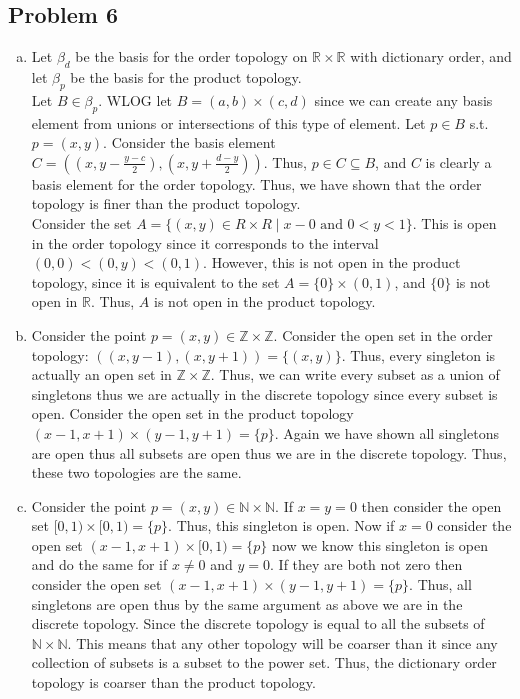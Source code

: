 \documentclass[12pt, letterpaper]{article}
\theoremstyle{definition}
\newcommand{\R}{\mathbb{R}}
\newcommand{\Z}{\mathbb{Z}}
\newcommand{\N}{\mathbb{N}}
\renewcommand{\t}[1]{\text{#1}}
\begin{document}
\newpage
\subsection*{Problem 6}
\begin{enumerate}[(a)]
    \item Let $\beta_d$ be the basis for the order topology on $\R\times \R$ with dictionary order, and let $\beta_p$ be the basis for the product topology.\\
    Let $B \in \beta_p$. WLOG let $B=(a,b)\times(c,d)$ since we can create any basis element from unions or intersections of this type of element. Let $p \in B$ s.t. $p=(x,y)$. Consider the basis element $C=((x,y-\frac{y-c}{2}),(x,y+\frac{d-y}{2}))$. Thus, $p \in C \subseteq B$, and $C$ is clearly a basis element for the order topology. Thus, we have shown that the order topology is finer than the product topology.\\
    Consider the set $A=\{(x,y) \in R\times R \mid x-0 \t{ and } 0 < y < 1\}$. This is open in the order topology since it corresponds to the interval $(0,0)<(0,y)<(0,1)$. However, this is not open in the product topology, since it is equivalent to the set $A=\{0\} \times (0,1)$, and $\{0\}$ is not open in $\R$. Thus, $A$ is not open in the product topology.
    \item Consider the point $p=(x,y) \in \Z \times \Z$. Consider the open set in the order topology: $((x,y-1),(x,y+1))=\{(x,y)\}$. Thus, every singleton is actually an open set in $\Z \times \Z$. Thus, we can write every subset as a union of singletons thus we are actually in the discrete topology since every subset is open. Consider the open set in the product topology $(x-1,x+1) \times (y-1,y+1)=\{p\}$. Again we have shown all singletons are open thus all subsets are open thus we are in the discrete topology. Thus, these two topologies are the same.
    \item Consider the point $p=(x,y) \in \N \times \N$. If $x=y=0$ then consider the open set $[0,1) \times [0,1)=\{p\}$. Thus, this singleton is open. Now if $x=0$ consider the open set $(x-1,x+1) \times [0,1)=\{p\}$ now we know this singleton is open and do the same for if $x \neq 0$ and $y=0$. If they are both not zero then consider the open set $(x-1,x+1) \times (y-1,y+1)=\{p\}$. Thus, all singletons are open thus by the same argument as above we are in the discrete topology. Since the discrete topology is equal to all the subsets of $\N \times \N$. This means that any other topology will be coarser than it since any collection of subsets is a subset to the power set. Thus, the dictionary order topology is coarser than the product topology.\\

\end{enumerate}
\end{document}
